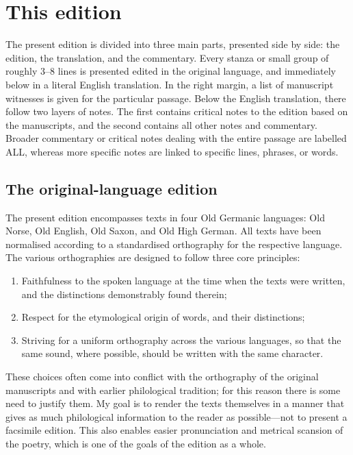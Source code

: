 \section{This edition}

  The present edition is divided into three main parts, presented side by side: the edition, the translation, and the commentary.  Every stanza or small group of roughly 3--8 lines is presented edited in the original language, and immediately below in a literal English translation.  In the right margin, a list of manuscript witnesses is given for the particular passage.  Below the English translation, there follow two layers of notes.  The first contains critical notes to the edition based on the manuscripts, and the second contains all other notes and commentary.  Broader commentary or critical notes dealing with the entire passage are labelled ALL, whereas more specific notes are linked to specific lines, phrases, or words.

  \subsection{The original-language edition}

    The present edition encompasses texts in four Old Germanic languages: Old Norse, Old English, Old Saxon, and Old High German.  All texts have been normalised according to a standardised orthography for the respective language.  The various orthographies are designed to follow three core principles:

    \begin{enumerate}
      \item Faithfulness to the spoken language at the time when the texts were written, and the distinctions demonstrably found therein;
      \item Respect for the etymological origin of words, and their distinctions;
      \item Striving for a uniform orthography across the various languages, so that the same sound, where possible, should be written with the same character.
    \end{enumerate}

    These choices often come into conflict with the orthography of the original manuscripts and with earlier philological tradition; for this reason there is some need to justify them.  My goal is to render the texts themselves in a manner that gives as much philological information to the reader as possible---not to present a facsimile edition.  This also enables easier pronunciation and metrical scansion of the poetry, which is one of the goals of the edition as a whole.

